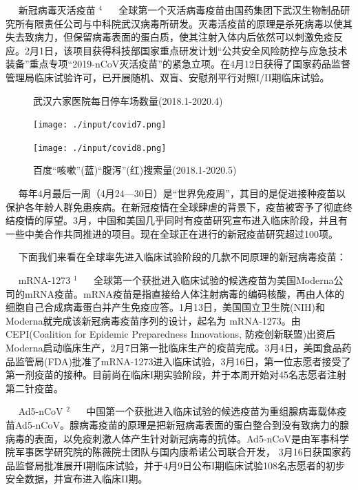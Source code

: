 \documentclass[
]{article}
\begin{document}
\(\quad\) 新冠病毒灭活疫苗 \(^4\) \(\quad\)
全球第一个灭活病毒疫苗由国药集团下武汉生物制品研究所有限责任公司与中科院武汉病毒所研发。灭毒活疫苗的原理是杀死病毒以使其失去致病力，但保留病毒表面的蛋白质，使其注射入体内后依然可以刺激免疫反应。2月1日，该项目获得科技部国家重点研发计划``公共安全风险防控与应急技术装备''重点专项``2019-nCoV灭活疫苗''的紧急立项。在4月12日获得了国家药品监督管理局临床试验许可，已开展随机、双盲、安慰剂平行对照I/II期临床试验。

\begin{figure}[H]
\centering
\begin{minipage}[b]{0.48\linewidth}
\caption{武汉六家医院每日停车场数量(2018.1-2020.4)}
\texttt{[image: ./input/covid7.png]}
\label{}
\end{minipage}
\quad
\begin{minipage}[b]{0.48\linewidth}
\caption{百度“咳嗽”(蓝)“腹泻”(红)搜索量(2018.1-2020.5)}
\texttt{[image: ./input/covid8.png]}
\label{}
\end{minipage}
\end{figure}

\vspace{-3mm}

\(\quad\)
每年4月最后一周（4月24---30日）是``世界免疫周''，其目的是促进接种疫苗以保护各年龄人群免患疾病。在新冠疫情在全球肆虐的背景下，疫苗被寄予了彻底终结疫情的厚望。3月，中国和美国几乎同时有疫苗研究宣布进入临床阶段，并且有一些中美合作共同推进的项目。现在全球正在进行的新冠疫苗研究超过100项。

\(\quad\)
下面我们来看在全球率先进入临床试验阶段的几款不同原理的新冠病毒疫苗：

\(\quad\) mRNA-1273 \(^1\) \(\quad\)
全球第一个获批进入临床试验的候选疫苗为美国Moderna公司的mRNA疫苗。mRNA疫苗是指直接给人体注射病毒的编码核酸，再由人体的细胞自己合成病毒蛋白并产生免疫应答。1月13日，美国国立卫生院(NIH)和Moderna就完成该新冠病毒疫苗序列的设计，起名为
mRNA-1273。由CEPI(Coalition for Epidemic Preparedness Innovations,
防疫创新联盟)出资后Moderna启动临床生产，2月7日第一批临床生产的疫苗完成。3月4日，美国食品药品监管局(FDA)批准了mRNA-1273进入临床试验，3月16日，第一位志愿者接受了第一剂疫苗的接种。目前尚在临床I期实验阶段，并于本周开始对45名志愿者注射第二针疫苗。

\(\quad\) Ad5-nCoV \(^2\) \(\quad\)
中国第一个获批进入临床试验的候选疫苗为重组腺病毒载体疫苗Ad5-nCoV。腺病毒疫苗的原理是把新冠病毒表面的蛋白整合到没有致病力的腺病毒的表面，以免疫刺激人体产生针对新冠病毒的抗体。Ad5-nCoV是由军事科学院军事医学研究院的陈薇院士团队与国内康希诺公司联合开发，
3月16日获国家药品监督局批准展开I期临床试验，并于4月9日公布I期临床试验108名志愿者的初步安全数据，并宣布进入临床II期。
\end{document}
